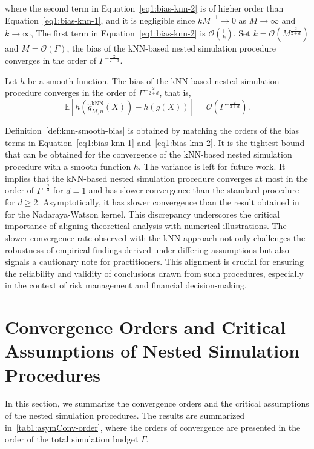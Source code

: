 where the second term in Equation~\ref{eq1:bias-knn-2} is of higher order than Equation~\ref{eq1:bias-knn-1}, and it is negligible since $kM^{-1} \rightarrow 0$ as $M \rightarrow \infty$ and $k \rightarrow \infty$, 
The first term in Equation~\ref{eq1:bias-knn-2} is $\mathcal{O}\left(\frac{1}{k}\right)$.
Set $k = \mathcal{O}(M^{\frac{2}{2+d}})$ and $M = \mathcal{O}(\Gamma)$, the bias of the kNN-based nested simulation procedure converges in the order of $\Gamma^{-\frac{2}{2+d}}$.

\begin{definition} \label{def:knn-smooth-bias}
    Let $h$ be a smooth function. 
    The bias of the kNN-based nested simulation procedure converges in the order of $\Gamma^{-\frac{2}{2+d}}$, that is,
    $$ \mathbb{E} \left[ h(\hat{g}^{\text{kNN}}_{M, n}(X)) - h(g(X)) \right]  = \mathcal{O}(\Gamma^{-\frac{2}{2+d}}).$$
\end{definition}

Definition~\ref{def:knn-smooth-bias} is obtained by matching the orders of the bias terms in Equation~\ref{eq1:bias-knn-1} and~\ref{eq1:bias-knn-2}.
It is the tightest bound that can be obtained for the convergence of the kNN-based nested simulation procedure with a smooth function $h$.
The variance is left for future work.
It implies that the kNN-based nested simulation procedure converges at most in the order of $\Gamma^{-\frac{2}{3}}$ for $d = 1$ and has slower convergence than the standard procedure for $d \geq 2$.
Asymptotically, it has slower convergence than the result obtained in~\cite{hong2017kernel} for the Nadaraya-Watson kernel.
This discrepancy underscores the critical importance of aligning theoretical analysis with numerical illustrations.
The slower convergence rate observed with the kNN approach not only challenges the robustness of empirical findings derived under differing assumptions but also signals a cautionary note for practitioners. 
This alignment is crucial for ensuring the reliability and validity of conclusions drawn from such procedures, especially in the context of risk management and financial decision-making.

\section{Convergence Orders and Critical Assumptions of Nested Simulation Procedures}
\label{sec1:convergence-orders}

In this section, we summarize the convergence orders and the critical assumptions of the nested simulation procedures.
The results are summarized in~\ref{tab1:asymConv-order}, where the orders of convergence are presented in the order of the total simulation budget $\Gamma$.

